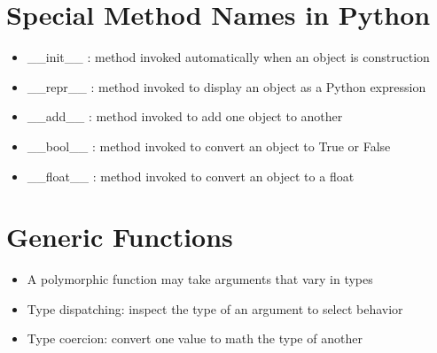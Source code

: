 \section{Special Method Names in Python}
\begin{itemize}
    \item \_\_init\_\_ : method invoked automatically when an object is construction
    \item \_\_repr\_\_ : method invoked to display an object as a Python expression
    \item \_\_add\_\_ : method invoked to add one object to another
    \item \_\_bool\_\_ : method invoked to convert an object to True or False
    \item \_\_float\_\_ : method invoked to convert an object to a float
\end{itemize}

\section{Generic Functions}
\begin{itemize}
    \item A polymorphic function may take arguments that vary in types
    \item Type dispatching: inspect the type of an argument to select behavior
    \item Type coercion: convert one value to math the type of another
\end{itemize}